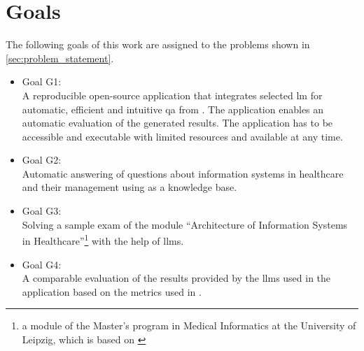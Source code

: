 \section{Goals}\label{sec:goals}
The following goals of this work are assigned to the problems shown in \cref{sec:problem_statement}.
\begin{itemize}
  \item Goal G1\label{def:goal 1}:\\
    A reproducible open-source application that integrates selected \ac{lm} for automatic, efficient and intuitive \ac{qa} from \citet{bb2}.
    The application enables an automatic evaluation of the generated results.
    The application has to be accessible and executable with limited resources and available at any time.
   \item Goal G2\label{def:goal 2}:\\
    Automatic answering of questions about information systems in healthcare and their management using \citet{bb2} as a knowledge base.
  \item Goal G3\label{def:goal 3}:\\
   Solving a sample exam of the module \enquote{Architecture of Information Systems in Healthcare}\footnote{\raggedright{}a module of the Master's program in Medical Informatics at the University of Leipzig, which is based on \citet{bb2}} with the help of \acp{llm}.
   \item Goal G4\label{def:goal 4}:\\
   A comparable evaluation of the results provided by the \acp{llm} used in the application based on the metrics used in \citet{Paul_Keller}.
\end{itemize}
